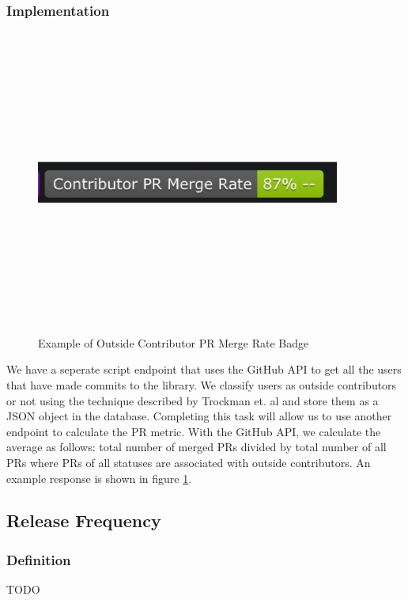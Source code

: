 \documentclass[12pt, letterpaper]{article}
\begin{document}
\subsubsection{Implementation}

\begin{figure}[!htb]
    \centerline{
        \includegraphics[width=10cm,height=10cm,keepaspectratio=true]{prbadge}
    }
    \caption{
        Example of Outside Contributor PR Merge Rate Badge 
    }
    \label{prbadge}
\end{figure}

We have a seperate script endpoint that uses the GitHub \cite{github} API to get all the users
that have made commits to the library. We classify users as outside contributors or not using
the technique described by Trockman et. al \cite{githubbadges} and store them as a JSON object in the database.
Completing this task will allow us to use another endpoint to calculate the PR metric.
With the GitHub \cite{github} API, we calculate
the average as follows: total number of merged PRs divided by total number of all PRs where 
PRs of all statuses are associated with outside contributors. An example response is shown in figure \ref{prbadge}.


\subsection{Release Frequency}
\subsubsection{Definition}
TODO
\end{document}

